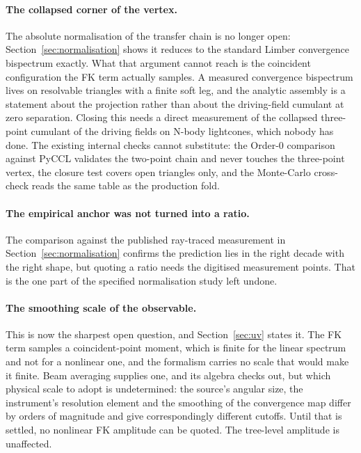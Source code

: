 \paragraph{The collapsed corner of the vertex.} The absolute normalisation
of the transfer chain is no longer open: Section~\ref{sec:normalisation}
shows it reduces to the standard Limber convergence bispectrum exactly.
What that argument cannot reach is the coincident configuration the FK term
actually samples. A measured convergence bispectrum lives on resolvable
triangles with a finite soft leg, and the analytic assembly is a statement
about the projection rather than about the driving-field cumulant at zero
separation. Closing this needs a direct measurement of the collapsed
three-point cumulant of the driving fields on N-body lightcones, which
nobody has done. The existing internal checks cannot substitute: the
Order-0 comparison against PyCCL validates the two-point chain and never
touches the three-point vertex, the  closure test covers open
triangles only, and the Monte-Carlo cross-check reads the same table as the
production fold.

\paragraph{The empirical anchor was not turned into a ratio.} The
comparison against the published ray-traced measurement in
Section~\ref{sec:normalisation} confirms the prediction lies in the right
decade with the right shape, but quoting a ratio needs the digitised
measurement points. That is the one part of the specified normalisation
study left undone.

\paragraph{The smoothing scale of the observable.} This is now the sharpest
open question, and Section~\ref{sec:uv} states it. The FK term samples a
coincident-point moment, which is finite for the linear spectrum and not
for a nonlinear one, and the formalism carries no scale that would make it
finite. Beam averaging supplies one, and its algebra checks out, but which
physical scale to adopt is undetermined: the source's angular size, the
instrument's resolution element and the smoothing of the convergence map
differ by orders of magnitude and give correspondingly different cutoffs.
Until that is settled, no nonlinear FK amplitude can be quoted. The
tree-level amplitude is unaffected.

